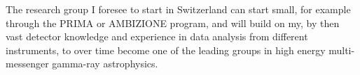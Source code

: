 \documentclass[10pt]{article}
\begin{document}
The research group I foresee to start in Switzerland can start small, for example through the PRIMA or AMBIZIONE program,  and will build on my, by then vast detector knowledge and experience in data analysis from different instruments, to over time become one of the leading groups in high energy multi-messenger gamma-ray astrophysics.
\end{document}
